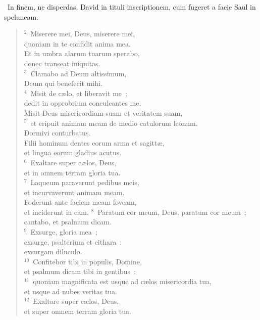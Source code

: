 ~\lettrine[lines=10,image=true,loversize=0.05,lraise=-0.03]{I}{}n finem, ne disperdas. David in tituli inscriptionem, cum fugeret a facie Saul in speluncam.
\begin{flushleft}\begin{verse}\vspace{6pt}${}^{2}$~Miserere mei, Deus, miserere mei,\\ quoniam in te confidit anima mea.\\ Et in umbra alarum tuarum sperabo,\\ donec transeat iniquitas.\\
${}^{3}$~Clamabo ad Deum altissimum,\\ Deum qui benefecit mihi.\\
${}^{4}$~Misit de c\ae lo, et liberavit me~;\\ dedit in opprobrium conculcantes me.\\ Misit Deus misericordiam suam et veritatem suam,\\
${}^{5}$~et eripuit animam meam de medio catulorum leonum.\\ Dormivi conturbatus.\\ Filii hominum dentes eorum arma et sagitt\ae ,\\ et lingua eorum gladius acutus.\\
${}^{6}$~Exaltare super c\ae los, Deus,\\ et in omnem terram gloria tua.\\
${}^{7}$~Laqueum paraverunt pedibus meis,\\ et incurvaverunt animam meam.\\ Foderunt ante faciem meam foveam,\\ et inciderunt in eam.
${}^{8}$~Paratum cor meum, Deus, paratum cor meum~;\\ cantabo, et psalmum dicam.\\
${}^{9}$~Exsurge, gloria mea~;\\ exsurge, psalterium et cithara~:\\ exsurgam diluculo.\\
${}^{10}$~Confitebor tibi in populis, Domine,\\ et psalmum dicam tibi in gentibus~:\\
${}^{11}$~quoniam magnificata est usque ad c\ae los misericordia tua,\\ et usque ad nubes veritas tua.\\
${}^{12}$~Exaltare super c\ae los, Deus,\\ et super omnem terram gloria tua.\end{verse}\end{flushleft}


